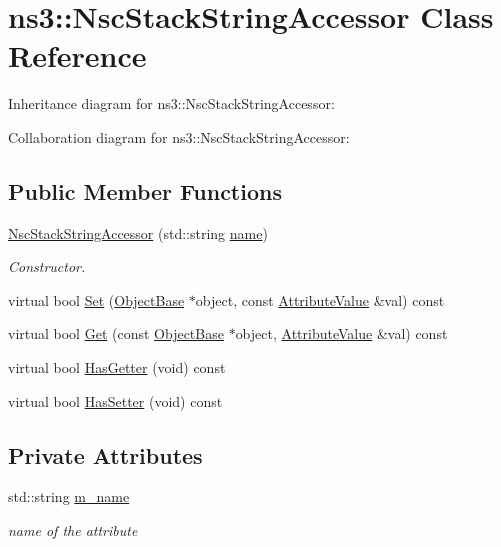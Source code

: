 \hypertarget{classns3_1_1NscStackStringAccessor}{}\section{ns3\+:\+:Nsc\+Stack\+String\+Accessor Class Reference}
\label{classns3_1_1NscStackStringAccessor}


Inheritance diagram for ns3\+:\+:Nsc\+Stack\+String\+Accessor\+:


Collaboration diagram for ns3\+:\+:Nsc\+Stack\+String\+Accessor\+:
\subsection*{Public Member Functions}
\begin{DoxyCompactItemize}
\item 
\hyperlink{classns3_1_1NscStackStringAccessor_a500f992355bbf6844cabd27318c1c9db}{Nsc\+Stack\+String\+Accessor} (std\+::string \hyperlink{generate__test__data__lte__spectrum__model_8m_ab74e6bf80237ddc4109968cedc58c151}{name})
\begin{DoxyCompactList}\small\item\em Constructor. \end{DoxyCompactList}\item 
virtual bool \hyperlink{classns3_1_1NscStackStringAccessor_af2aa19f3c565ee3c348481b0eb68db61}{Set} (\hyperlink{classns3_1_1ObjectBase}{Object\+Base} $\ast$object, const \hyperlink{classns3_1_1AttributeValue}{Attribute\+Value} \&val) const 
\item 
virtual bool \hyperlink{classns3_1_1NscStackStringAccessor_a862600e55dafc704dafbe2299bc36ccc}{Get} (const \hyperlink{classns3_1_1ObjectBase}{Object\+Base} $\ast$object, \hyperlink{classns3_1_1AttributeValue}{Attribute\+Value} \&val) const 
\item 
virtual bool \hyperlink{classns3_1_1NscStackStringAccessor_a0d9500d35e44985c7f6c00d54589e0bf}{Has\+Getter} (void) const 
\item 
virtual bool \hyperlink{classns3_1_1NscStackStringAccessor_ac2da10c555d5289bcea5fcaba4861192}{Has\+Setter} (void) const 
\end{DoxyCompactItemize}
\subsection*{Private Attributes}
\begin{DoxyCompactItemize}
\item 
std\+::string \hyperlink{classns3_1_1NscStackStringAccessor_a11ed4c4dbd0dc0fbd3e9835dde1e2fac}{m\+\_\+name}
\begin{DoxyCompactList}\small\item\em name of the attribute \end{DoxyCompactList}\end{DoxyCompactItemize}
